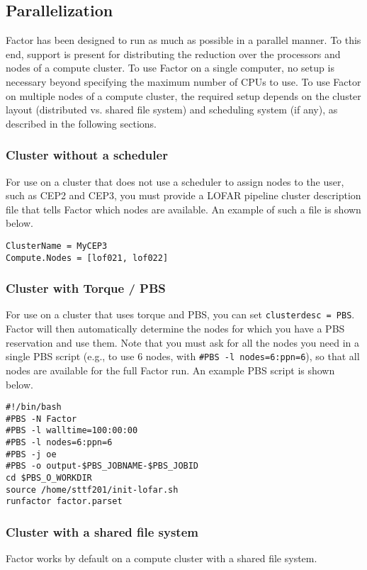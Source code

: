 \documentclass[structabstract]{article}
\begin{document}
\subsection{Parallelization}
\label{factor:parallel}

Factor has been designed to run as much as possible in a parallel manner. To
this end, support is present for distributing the reduction over the processors
and nodes of a compute cluster. To use Factor on a single computer, no setup is
necessary beyond specifying the maximum number of CPUs to use. To use Factor on
multiple nodes of a compute cluster, the required setup depends on the cluster
layout (distributed vs. shared file system) and scheduling system (if any), as
described in the following sections.

\subsubsection{Cluster without a scheduler}
For use on a cluster that does not use a scheduler to assign nodes to the user, such as CEP2 and CEP3,
you must provide a LOFAR pipeline cluster description file that tells Factor which nodes are
available. An example of such a file is shown below.

\begin{verbatim}
ClusterName = MyCEP3
Compute.Nodes = [lof021, lof022]
\end{verbatim}

\subsubsection{Cluster with Torque / PBS }
For use on a cluster that uses torque and PBS, you can set {\tt clusterdesc =
PBS}. Factor will then automatically determine the nodes for which you have a
PBS reservation and use them. Note that you must ask for all the nodes you need
in a single PBS script (e.g., to use 6 nodes, with {\tt \#PBS -l
nodes=6:ppn=6}), so that all nodes are available for the full Factor run. An
example PBS script is shown below.

\begin{verbatim}
#!/bin/bash
#PBS -N Factor
#PBS -l walltime=100:00:00
#PBS -l nodes=6:ppn=6
#PBS -j oe
#PBS -o output-$PBS_JOBNAME-$PBS_JOBID
cd $PBS_O_WORKDIR
source /home/sttf201/init-lofar.sh
runfactor factor.parset
\end{verbatim}

\subsubsection{Cluster with a shared file system}
Factor works by default on a compute cluster with a shared file system.
\end{document}
